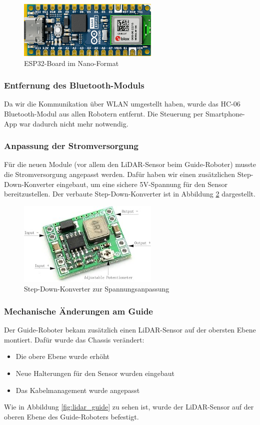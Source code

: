 \begin{figure}[H]
    \centering
    \includegraphics[width=0.6\textwidth]{img/Hardware/nanoesp32.png}
    \caption{ESP32-Board im Nano-Format}
    \label{fig:nanoesp32}
\end{figure}

\subsubsection{Entfernung des Bluetooth-Moduls}
Da wir die Kommunikation über WLAN umgestellt haben, wurde das HC-06 Bluetooth-Modul aus allen Robotern entfernt. Die Steuerung per Smartphone-App war dadurch nicht mehr notwendig.

\subsubsection{Anpassung der Stromversorgung}
Für die neuen Module (vor allem den LiDAR-Sensor beim Guide-Roboter) musste die Stromversorgung angepasst werden. Dafür haben wir einen zusätzlichen Step-Down-Konverter eingebaut, um eine sichere 5V-Spannung für den Sensor bereitzustellen. Der verbaute Step-Down-Konverter ist in Abbildung \ref{fig:stepdown} dargestellt.

\begin{figure}[H]
    \centering
    \includegraphics[width=0.6\textwidth]{img/Hardware/stepdown.png}
    \caption{Step-Down-Konverter zur Spannungsanpassung}
    \label{fig:stepdown}
\end{figure}

\subsubsection{Mechanische Änderungen am Guide}
Der Guide-Roboter bekam zusätzlich einen LiDAR-Sensor auf der obersten Ebene montiert. Dafür wurde das Chassis verändert:
\begin{itemize}
    \item Die obere Ebene wurde erhöht
    \item Neue Halterungen für den Sensor wurden eingebaut
    \item Das Kabelmanagement wurde angepasst
\end{itemize}
Wie in Abbildung \ref{fig:lidar_guide} zu sehen ist, wurde der LiDAR-Sensor auf der oberen Ebene des Guide-Roboters befestigt.


